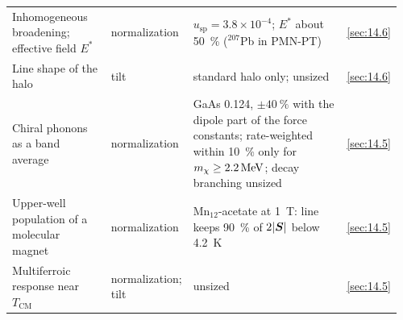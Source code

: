 \begin{table}[tbp]
\begin{tabular}{@{}>{\raggedright\arraybackslash}p{0.27\linewidth}>{\raggedright\arraybackslash}p{0.13\linewidth}>{\raggedright\arraybackslash}p{0.48\linewidth}>{\raggedright\arraybackslash}p{0.08\linewidth}@{}}
    Inhomogeneous broadening; effective field $E^*$ & normali\-zation & $u_{\mathrm{sp}} = 3.8\times10^{-4}$; $E^*$ about \SI{50}{\percent} ($^{207}$Pb in PMN-PT) & \cref{sec:14.6} \\
    Line shape of the halo & tilt & standard halo only; unsized & \cref{sec:14.6} \\
    Chiral phonons as a band average & normali\-zation & GaAs 0.124, $\pm\SI{40}{\percent}$ with the dipole part of the force constants; rate-weighted within \SI{10}{\percent} only for $m_{\chi} \ge \SI{2.2}{MeV}$; decay branching unsized & \cref{sec:14.5} \\
    Upper-well population of a molecular magnet & normali\-zation & Mn$_{12}$-acetate at \SI{1}{T}: line keeps \SI{90}{\percent} of $2|\bm{S}|$ below \SI{4.2}{K} & \cref{sec:14.5} \\
    Multiferroic response near $T_{\mathrm{CM}}$ & normali\-zation; tilt & unsized & \cref{sec:14.5} \\
    \bottomrule
  \end{tabular}
\end{table}
